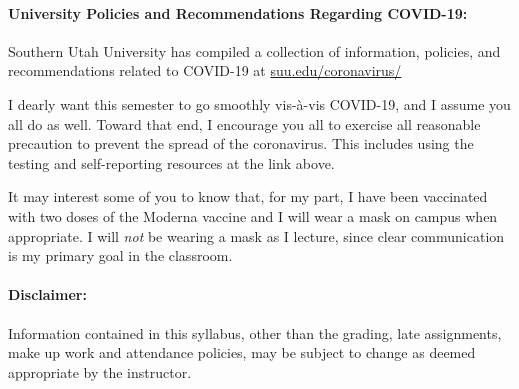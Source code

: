 \documentclass[12pt, letterpaper]{article}
\begin{document}
\paragraph{University Policies and Recommendations Regarding COVID-19:}
Southern Utah University has compiled a collection of information, policies, and recommendations related to COVID-19 at \href{https://www.suu.edu/coronavirus/}{suu.edu/coronavirus/}

\noindent I dearly want this semester to go smoothly vis-\`a-vis COVID-19, and I assume you all do as well. Toward that end, I encourage you all to exercise all reasonable precaution to prevent the spread of the coronavirus. This includes using the testing and self-reporting resources at the link above.

\noindent It may interest some of you to know that, for my part, I have been vaccinated with two doses of the Moderna vaccine and I will wear a mask on campus when appropriate. I will \emph{not} be wearing a mask as I lecture, since clear communication is my primary goal in the classroom.

\paragraph{Disclaimer:}
Information contained in this syllabus, other than the grading, late assignments, make up work and attendance policies, may be subject to change as deemed appropriate by the instructor.
\end{document}
